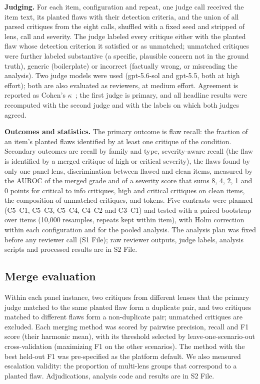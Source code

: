 \documentclass[10pt,letterpaper]{article}
\begin{document}
\textbf{Judging.} For each item, configuration and repeat, one judge call received the item text, its planted flaws with their detection criteria, and the union of all parsed critiques from the eight calls, shuffled with a fixed seed and stripped of lens, call and severity. The judge labeled every critique either with the planted flaw whose detection criterion it satisfied or as unmatched; unmatched critiques were further labeled substantive (a specific, plausible concern not in the ground truth), generic (boilerplate) or incorrect (factually wrong, or misreading the analysis). Two judge models were used (gpt-5.6-sol and gpt-5.5, both at high effort); both are also evaluated as reviewers, at medium effort. Agreement is reported as Cohen's $\kappa$~\cite{cohen1960kappa}; the first judge is primary, and all headline results were recomputed with the second judge and with the labels on which both judges agreed.

\textbf{Outcomes and statistics.} The primary outcome is flaw recall: the fraction of an item's planted flaws identified by at least one critique of the condition. Secondary outcomes are recall by family and type, severity-aware recall (the flaw is identified by a merged critique of high or critical severity), the flaws found by only one panel lens, discrimination between flawed and clean items, measured by the AUROC of the merged grade and of a severity score that sums 8, 4, 2, 1 and 0 points for critical to info critiques, high and critical critiques on clean items, the composition of unmatched critiques, and tokens. Five contrasts were planned (C5--C1, C5--C3, C5--C4, C4--C2 and C3--C1) and tested with a paired bootstrap over items (10,000 resamples, repeats kept within item), with Holm correction~\cite{holm1979simple} within each configuration and for the pooled analysis. The analysis plan was fixed before any reviewer call (S1 File); raw reviewer outputs, judge labels, analysis scripts and processed results are in S2 File.

\subsection*{Merge evaluation}

Within each panel instance, two critiques from different lenses that the primary judge matched to the same planted flaw form a duplicate pair, and two critiques matched to different flaws form a non-duplicate pair; unmatched critiques are excluded. Each merging method was scored by pairwise precision, recall and F1 score (their harmonic mean), with its threshold selected by leave-one-scenario-out cross-validation (maximizing F1 on the other scenarios). The method with the best held-out F1 was pre-specified as the platform default. We also measured escalation validity: the proportion of multi-lens groups that correspond to a planted flaw. Adjudications, analysis code and results are in S2 File.
\end{document}
